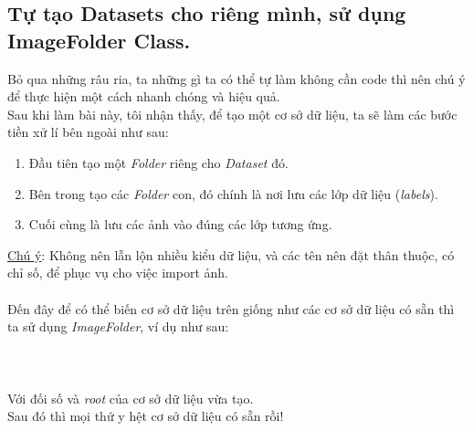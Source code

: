 \documentclass{article}
\begin{document}
    \subsection{Tự tạo Datasets cho riêng mình, sử dụng ImageFolder Class.}
    Bỏ qua những râu ria, ta những gì ta có thể tự làm không cần code thì nên chú ý để thực hiện một cách nhanh chóng và hiệu quả.\\
    Sau khi làm bài này, tôi nhận thấy, để tạo một cơ sở dữ liệu, ta sẽ làm các bước tiền xử lí bên ngoài như sau:
    \begin{enumerate}
        \item Đầu tiên tạo một \textit{Folder} riêng cho \textit{Dataset} đó.
        \item Bên trong tạo các \textit{Folder} con, đó chính là nơi lưu các lớp dữ liệu (\textit{labels}). 
        \item Cuối cùng là lưu các ảnh vào đúng các lớp tương ứng. 
    \end{enumerate}
    \underline{Chú ý}: Không nên lẫn lộn nhiều kiểu dữ liệu, và các tên nên đặt thân thuộc, có chỉ số, để phục vụ cho việc import ảnh.\\ \\
    Đến đây để có thể biến cơ sở dữ liệu trên giống như các cơ sở dữ liệu có sẵn thì ta sử dụng \textit{ImageFolder}, ví dụ như sau:\\ \\
    \\ \\
    Với đối số và \textit{root} của cơ sở dữ liệu vừa tạo. \\
    Sau đó thì mọi thứ y hệt cơ sở dữ liệu có sẵn rồi!
\end{document}
